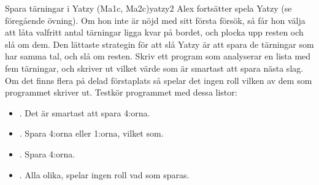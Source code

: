 \begin{matteovningm}{Spara tärningar i Yatzy (Ma1c, Ma2c)}{yatzy2}
Alex fortsätter spela Yatzy (se föregående övning). Om hon inte är nöjd med sitt första försök, så får hon välja att låta valfritt antal tärningar ligga kvar på bordet, och plocka upp resten och slå om dem. Den lättaste strategin för att slå Yatzy är att spara de tärningar som har samma tal, och slå om resten.
\newline
\newline
Skriv ett program som analyserar en lista med fem tärningar, och skriver ut vilket värde som är smartast att spara nästa slag. Om det finns flera på delad förstaplats så spelar det ingen roll vilken av dem som programmet skriver ut. Testkör programmet med dessa listor:

\begin{itemize}
\item \cw{[1, 4, 5, 4, 3]}. Det är smartast att spara 4:orna.
\item \cw{[1, 4, 5, 4, 1]}. Spara 4:orna eller 1:orna, vilket som.
\item \cw{[1, 4, 4, 4, 1]}. Spara 4:orna.
\item \cw{[1, 4, 5, 6, 3]}. Alla olika, spelar ingen roll vad som sparas.
\end{itemize}
\end{matteovningm}

